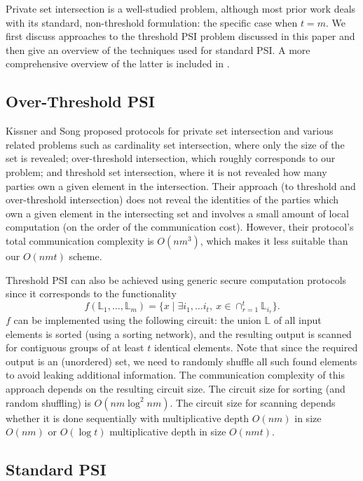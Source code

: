 Private set intersection is a well-studied problem, although most
prior work deals with its standard, non-threshold formulation: the
specific case when $t=m$. We first discuss approaches to the threshold
PSI problem discussed in this paper and then give an overview of the
techniques used for standard PSI. A more comprehensive overview of
the latter is included in \cite{Pinkas}.

\subsection{Over-Threshold PSI}

Kissner and Song \cite{Kissner} proposed protocols for private set
intersection and various related problems such as cardinality set
intersection, where only the size of the set is revealed; over-threshold
intersection, which roughly corresponds to our problem; and threshold
set intersection, where it is not revealed how many parties own a
given element in the intersection. Their approach (to threshold
and over-threshold intersection) does not reveal the identities of
the parties which own a given element in the intersecting set and
involves a small amount of local computation (on the order of the
communication cost). However, their protocol's total communication
complexity is $O(nm^{3})$, which makes it less suitable than our 
$O(nmt)$ scheme.

Threshold PSI can also be achieved using generic secure computation
protocols since it corresponds to the functionality 
\[
f(\mathbb{L}_{1},\ldots,\mathbb{L}_{m})=\{x\mid\exists i_{1},\ldots i_{t},\ x\in\cap_{r=1}^{t}\mathbb{L}_{i_{r}}\}.
\]
$f$ can be implemented using the following circuit: the union $\mathbb{L}$
of all input elements is sorted (using a sorting network), and the
resulting output is scanned for contiguous groups of at least $t$
identical elements. Note that since the required output is an (unordered)
set, we need to randomly shuffle all such found elements to avoid
leaking additional information. The communication complexity of this
approach depends on the resulting circuit size.  The circuit size for 
sorting (and random shuffling) is $O(nm\log^{2}nm)$. The circuit size for
scanning depends whether it is done sequentially with multiplicative depth
$O(nm)$ in size $O(nm)$ or $O(\log t)$ multiplicative depth in size $O(nmt)$.

\subsection{Standard PSI }

